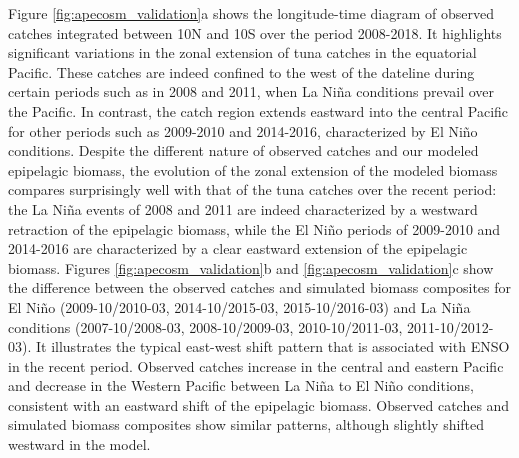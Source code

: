 Figure \ref{fig:apecosm_validation}a shows the longitude-time diagram of observed catches integrated between 10N and 10S over the period 2008-2018. It highlights significant variations in the zonal extension of tuna catches in the equatorial Pacific. These catches are indeed confined to the west of the dateline during certain periods such as in 2008 and 2011, when La Niña conditions prevail over the Pacific. In contrast, the catch region extends eastward into the central Pacific for other periods such as 2009-2010 and 2014-2016, characterized by El Niño conditions. Despite the different nature of observed catches and our modeled epipelagic biomass, the evolution of the zonal extension of the modeled biomass compares surprisingly well with that of the tuna catches over the recent period: the La Niña events of 2008 and 2011 are indeed characterized by a westward retraction of the epipelagic biomass, while the El Niño periods of 2009-2010 and 2014-2016 are characterized by a clear eastward extension of the epipelagic biomass. Figures \ref{fig:apecosm_validation}b and \ref{fig:apecosm_validation}c show the difference between the observed catches and simulated biomass composites for El Niño (2009-10/2010-03, 2014-10/2015-03, 2015-10/2016-03) and La Niña conditions (2007-10/2008-03, 2008-10/2009-03, 2010-10/2011-03, 2011-10/2012-03). It illustrates the typical east-west shift pattern that is associated with ENSO in the recent period. Observed catches increase in the central and eastern Pacific and decrease in the Western Pacific between La Niña to El Niño conditions, consistent with an eastward shift of the epipelagic biomass. Observed catches and simulated biomass composites show similar patterns, although slightly shifted westward in the model.

